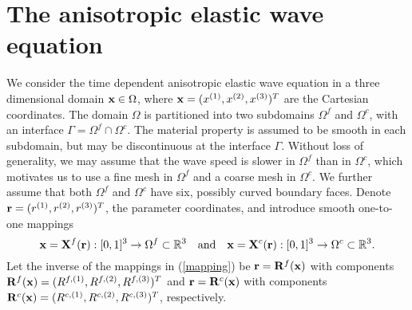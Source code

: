 \section{The anisotropic elastic wave equation}
We consider the time dependent anisotropic elastic wave equation in a three dimensional domain ${\bf x}\in\Omega$, where ${\bf x} = (x^{(1)},x^{(2)},x^{(3)})^T$ are the Cartesian coordinates. The domain $\Omega$ is partitioned into two subdomains $\Omega^f$ and $\Omega^c$, with an interface $\Gamma = \Omega^f\cap\Omega^c$. The material property is assumed to be smooth in each subdomain, but may be discontinuous at the interface $\Gamma$. Without loss of generality, we may assume that the wave speed is slower in $\Omega^f$ than in $\Omega^c$, which motivates us to use a fine mesh in $\Omega^f$ and a coarse mesh in $\Omega^c$. We further assume that both $\Omega^f$ and $\Omega^c$ have six, possibly curved boundary faces. Denote ${\bf r} = (r^{(1)},r^{(2)},r^{(3)})^T$, the parameter coordinates, and  introduce smooth one-to-one mappings 
\begin{equation}\label{mapping}
{\bf x}= {\bf X}^{f}({\bf r}) :  [0,1]^3 \rightarrow \Omega^{f} \subset \mathbb{R}^3 \ \ \ \mbox{and} \ \ \ {\bf x} = {\bf X}^{c}({\bf r}) :  [0,1]^3 \rightarrow \Omega^{c} \subset \mathbb{R}^3.
\end{equation}
Let the inverse of the mappings in (\ref{mapping}) be ${\bf r} = {\bf R}^f({\bf x})$ with components ${\bf R}^f({\bf x}) = (R^{f,(1)}, R^{f,(2)}, R^{f,(3)})^T$ and ${\bf r} = {\bf R}^c({\bf x})$ with components ${\bf R}^c({\bf x}) = (R^{c,(1)}, R^{c,(2)}, R^{c,(3)})^T$, respectively.
 
